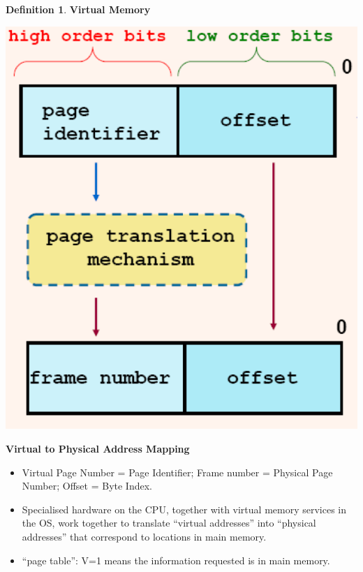 \documentclass[11pt,a4paper]{article}
\theoremstyle{definition}
\newtheorem{definition}{Definition}[section]
\newenvironment{myitemize}
{ \begin{itemize}
    \setlength{\itemsep}{5pt}
    \setlength{\parskip}{0pt}
    \setlength{\parsep}{0pt}     }
{ \end{itemize}                  }
\begin{document}
\begin{definition}{\textbf{Virtual Memory}}
\begin{minipage}{0.25\linewidth}
\end{minipage}
\begin{minipage}{0.25\linewidth}
	\includegraphics[width=1\linewidth]{m5/addressMapping}	
\end{minipage}

\textbf{Virtual to Physical Address Mapping}

\begin{minipage}{0.75\linewidth}
	\begin{myitemize}
		\item Virtual Page Number = Page Identifier; Frame number = Physical Page Number; Offset = Byte Index.
		\item Specialised hardware on the CPU, together with virtual memory services in the OS, work together to translate “virtual addresses” into “physical addresses” that correspond to locations in main memory.
		\item ``page table'': V=1 means the information requested is in main memory.
	\end{myitemize}
	

\end{minipage}
\end{definition}
\end{document}

